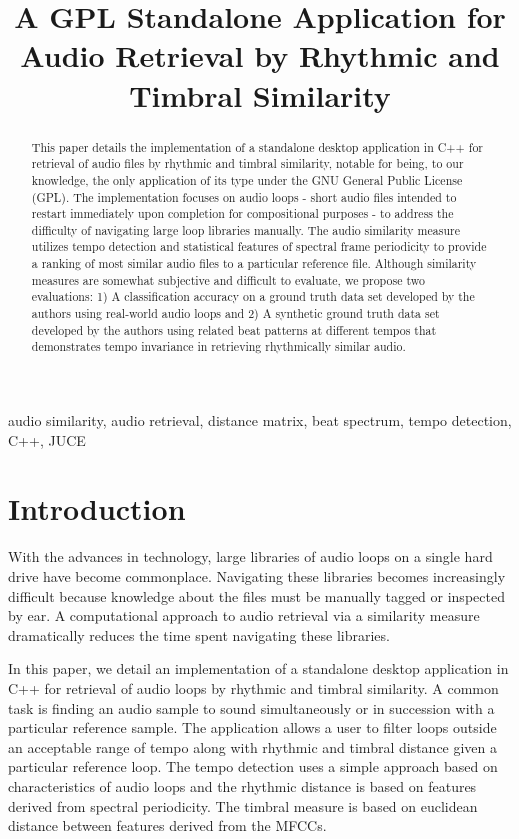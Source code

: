 \documentclass{article}
\title{A GPL Standalone Application for Audio Retrieval by Rhythmic and Timbral Similarity}
\begin{document}
%
\maketitle
%
\begin{abstract}
This paper details the implementation of a standalone desktop application in C++ for retrieval of audio files by rhythmic and timbral similarity, notable for being, to our knowledge, the only application of its type under the GNU General Public License (GPL). The implementation focuses on audio loops - short audio files intended to restart immediately upon completion for compositional purposes - to address the difficulty of navigating large loop libraries manually. The audio similarity measure utilizes tempo detection and statistical features of spectral frame periodicity to provide a ranking of most similar audio files to a particular reference file. Although similarity measures are somewhat subjective and difficult to evaluate, we propose two evaluations: 1) A classification accuracy on a ground truth data set developed by the authors using real-world audio loops and 2) A synthetic ground truth data set developed by the authors using related beat patterns at different tempos that demonstrates tempo invariance in retrieving rhythmically similar audio.
\end{abstract}
%
\begin{keywords}
audio similarity, audio retrieval, distance matrix, beat spectrum, tempo detection, C++, JUCE
\end{keywords}
%
\section{Introduction}

With the advances in technology, large libraries of audio loops on a single hard drive have become commonplace. Navigating these libraries becomes increasingly difficult because knowledge about the files must be manually tagged or inspected by ear. A computational approach to audio retrieval via a similarity measure dramatically reduces the time spent navigating these libraries.

In this paper, we detail an implementation of a standalone desktop application in C++ for retrieval of audio loops by rhythmic and timbral similarity. A common task is finding an audio sample to sound simultaneously or in succession with a particular reference sample. The application allows a user to filter loops outside an acceptable range of tempo along with rhythmic and timbral distance given a particular reference loop. The tempo detection uses a simple approach based on characteristics of audio loops and the rhythmic distance is based on features derived from spectral periodicity. The timbral measure is based on euclidean distance between features derived from the MFCCs.
\end{document}
